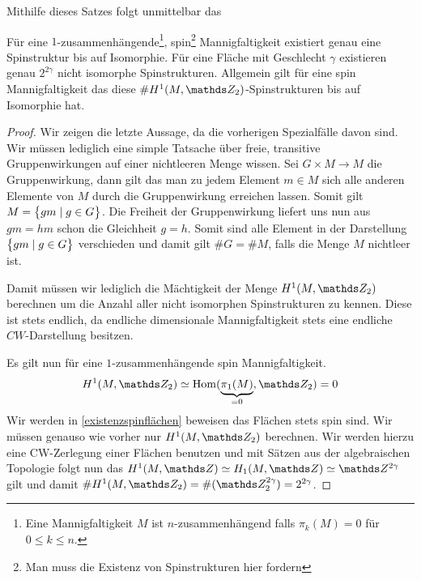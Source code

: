 Mithilfe dieses Satzes folgt unmittelbar das
\begin{Kor}
	Für eine $ 1 $-zusammenhängende\footnote{Eine Mannigfaltigkeit $ M $ ist $ n $-zusammenhängend falls $ \pi_k(M)=0 $ für $ 0\leq k\leq n $.}, spin\footnote{Man muss die Existenz von Spinstrukturen hier fordern} Mannigfaltigkeit existiert genau eine Spinstruktur bis auf Isomorphie. Für eine Fläche mit Geschlecht $ \gamma $ existieren
	genau $ 2^{2\gamma} $ nicht isomorphe Spinstrukturen. Allgemein
	gilt für eine spin Mannigfaltigkeit das diese $ \# H^1(M,\Z_2) $-Spinstrukturen bis auf Isomorphie hat.
	\begin{proof}
		Wir zeigen die letzte Aussage, da die vorherigen Spezialfälle
		davon sind. Wir müssen lediglich eine simple Tatsache über
		freie, transitive Gruppenwirkungen auf einer nichtleeren Menge wissen. Sei $ G\times M \longrightarrow M $ die Gruppenwirkung,
		dann gilt das man zu jedem Element $ m\in M $ sich alle
		anderen Elemente von $ M $ durch die Gruppenwirkung erreichen lassen. Somit gilt $ M = \bigl\{ gm \; | \; g\in G \bigr\} $. Die Freiheit
		der Gruppenwirkung liefert uns nun aus $ gm=hm $ schon die 
		Gleichheit $ g=h $. Somit sind alle Element in der Darstellung
		$ \bigl\{ gm \; | \; g\in G \bigr\} $ verschieden und damit gilt $ \# G = \# M $,
		falls die Menge $ M $ nichtleer ist.
		
		Damit müssen wir lediglich die Mächtigkeit der Menge $ H^1(M,\Z_2) $
		berechnen um die Anzahl aller nicht isomorphen Spinstrukturen zu kennen. Diese ist stets endlich, da endliche dimensionale Mannigfaltigkeit stets eine endliche $ CW $-Darstellung besitzen.
		
		Es gilt nun für eine $ 1 $-zusammenhängende spin Mannigfaltigkeit.
		\begin{gather*}
			H^1(M,\Z_2)\simeq \Hom(\underbrace{\pi_1(M)}_{=0},\Z_2)=0 
		\end{gather*}
		Wir werden in \cref{existenzspinflächen} beweisen das Flächen
		stets spin sind. Wir müssen genauso wie vorher nur $ H^1(M,\Z_2) $
		berechnen. Wir werden hierzu eine CW-Zerlegung einer Flächen
		benutzen und mit Sätzen aus der algebraischen Topologie folgt nun
		das $ H^1(M,\Z) \simeq H_1(M,\Z)\simeq\Z^{2\gamma} $ gilt und damit 
		$ \# H^1(M,\Z_2) = \# (\Z_2^{2\gamma})  = 2^{2\gamma}$.
		

\end{proof}
\end{Kor}

